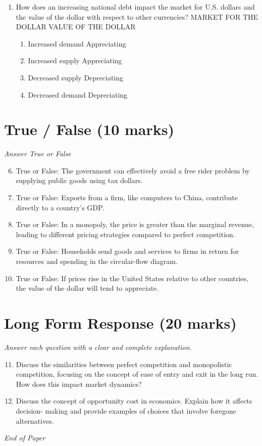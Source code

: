 \documentclass[12pt]{article}
\begin{document}
\begin{enumerate}[label=\arabic*.]
\begin{enumerate}[label=(\alph*)]
    \item Real GDP rises but the change in the price level is uncertain.
\end{enumerate}
\item How does an increasing national debt impact the market for U.S. dollars and the value of
the dollar with respect to other currencies? MARKET FOR THE DOLLAR VALUE OF THE DOLLAR
\begin{enumerate}[label=(\alph*)]
    \item Increased demand Appreciating
    \item Increased supply Appreciating
    \item Decreased supply Depreciating
    \item Decreased demand Depreciating
\end{enumerate}
\end{enumerate}

\section*{True / False (10 marks)}
\textit{Answer True or False}
\begin{enumerate}[label=\arabic*.]
\setcounter{enumi}{5}
\item True or False: The government can effectively avoid a free rider problem by supplying public goods using tax dollars.
\item True or False: Exports from a firm, like computers to China, contribute directly to a country's GDP.
\item True or False: In a monopoly, the price is greater than the marginal revenue, leading to different pricing strategies compared to perfect competition.
\item True or False: Households send goods and services to firms in return for resources and spending in the circular-flow diagram.
\item True or False: If prices rise in the United States relative to other countries, the value of the dollar will tend to appreciate.
\end{enumerate}

\section*{Long Form Response (20 marks)}
\textit{Answer each question with a clear and complete explanation.}
\begin{enumerate}[label=\arabic*.]
\setcounter{enumi}{10}
\item Discuss the similarities between perfect competition and monopolistic competition,
focusing on the concept of ease of entry and exit in the long run. How does this impact
market dynamics?
\item Discuss the concept of opportunity cost in economics. Explain how it affects decision-
making and provide examples of choices that involve foregone alternatives.
\end{enumerate}

\vfill
\noindent\textit{End of Paper}
\end{document}
